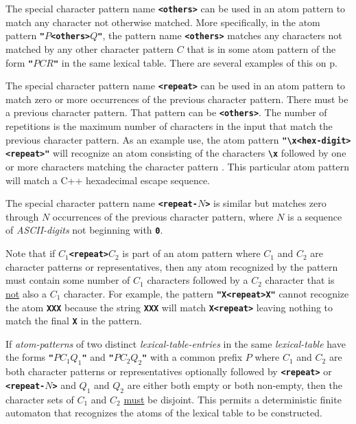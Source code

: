 \documentclass[12pt]{article}
\newcommand{\TT}[1]{{\tt \bfseries #1}}
\newcommand{\pagref}[1]{p\pageref{#1}}
\begin{document}
The special character pattern name
\TT{<{others}>}%
%
\label{<OTHERS>}
can be used in an atom pattern to match any character not otherwise
matched.  More specifically, in the atom pattern
\TT{"}$P$\TT{<others>}$Q$\TT{"},
the pattern name \TT{<others>} matches any characters not matched by
any other character pattern $C$ that is in some atom pattern of the form
\TT{"}$PCR$\TT{"} in the same lexical table.
There are several examples of this on \pagref{EXAMPLE-LEXEME-PROGRAM}.

The special character pattern name
\TT{<{repeat}>}%
%
\label{<REPEAT>}
can be used in an atom pattern to match zero or more occurrences of
the previous character pattern.  There must be a previous character
pattern.  That pattern can be \TT{<others>}.
The number of repetitions is the maximum number of characters in
the input that match the previous character pattern.
As an example use, the atom pattern \TT{"\textbackslash x<hex-digit><repeat>"}
will recognize an atom consisting of the characters \TT{\textbackslash x}
followed by one or more characters matching the character pattern
\TT{<hex-digit>}.  This particular atom pattern will match a C++
hexadecimal escape sequence.

The special character pattern name
\TT{<{repeat-$N$}>}%
%
is similar but matches zero through $N$ occurrences of the previous
character pattern, where $N$ is a sequence of {\em ASCII-digits}
not beginning with \TT{0}.

Note that if \TT{$C_1$<repeat>$C_2$} is part of an atom pattern where
$C_1$ and $C_2$ are character patterns or representatives, then
any atom recognized by the pattern must contain some number of
$C_1$ characters followed by a $C_2$ character that is \underline{not} also
a $C_1$ character.
For example, the pattern
\TT{"X<repeat>X"} cannot recognize the atom \TT{XXX} because the
string \TT{XXX} will match \TT{X<repeat>} leaving nothing to match
the final \TT{X} in the pattern.

If {\em atom-patterns} of two distinct {\em lexical-table-entries}
in the same {\em lexical-table} have the forms 
\TT{"}$PC_1Q_1$\TT{"} and \TT{"}$PC_2Q_2$\TT{"} with a common
prefix $P$ where
$C_1$ and $C_2$ are both character patterns or representatives
optionally followed
by \TT{<repeat>} or \TT{<repeat-$N$>} and
$Q_1$ and $Q_2$ are either both empty or both non-empty,
then the character sets of $C_1$ and $C_2$ \underline{must}
be disjoint.  This permits a deterministic finite automaton that
recognizes the atoms of the lexical table to be constructed.
\end{document}
